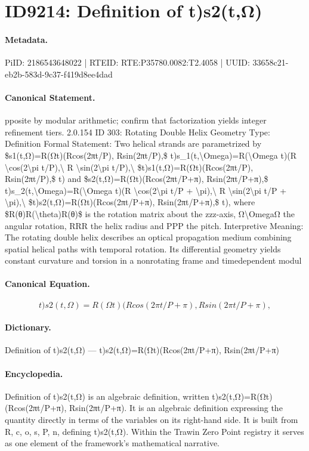 \section*{ID9214: Definition of t)s2(t,Ω)}
\paragraph{Metadata.}
PiID: 2186543648022 | RTEID: RTE:P35780.0082:T2.4058 | UUID: 33658c21-eb2b-583d-9c37-f419d8ee4dad

\paragraph{Canonical Statement.}
pposite by modular arithmetic; confirm that factorization yields integer refinement tiers. 2.0.154 ID 303: Rotating Double Helix Geometry Type: Definition Formal Statement: Two helical strands are parametrized by \$s1(t,Ω)=R(Ωt)(Rcos(2πt/P), Rsin(2πt/P),\$ t)s\_1(t,\textbackslash{}Omega)=R(\textbackslash{}Omega t)(R \textbackslash{}cos(2\textbackslash{}pi t/P),\textbackslash{} R \textbackslash{}sin(2\textbackslash{}pi t/P),\textbackslash{} \$t)s1(t,Ω)=R(Ωt)(Rcos(2πt/P), Rsin(2πt/P),\$ t) and \$s2(t,Ω)=R(Ωt)(Rcos(2πt/P+π), Rsin(2πt/P+π),\$ t)s\_2(t,\textbackslash{}Omega)=R(\textbackslash{}Omega t)(R \textbackslash{}cos(2\textbackslash{}pi t/P + \textbackslash{}pi),\textbackslash{} R \textbackslash{}sin(2\textbackslash{}pi t/P + \textbackslash{}pi),\textbackslash{} \$t)s2(t,Ω)=R(Ωt)(Rcos(2πt/P+π), Rsin(2πt/P+π),\$ t), where \$R(θ)R(\textbackslash{}theta)R(θ)\$ is the rotation matrix about the zzz-axis, Ω\textbackslash{}OmegaΩ the angular rotation, RRR the helix radius and PPP the pitch. Interpretive Meaning: The rotating double helix describes an optical propagation medium combining spatial helical paths with temporal rotation. Its differential geometry yields constant curvature and torsion in a nonrotating frame and timedependent modul

\paragraph{Canonical Equation.}
\[
t)s2(t,Ω)=R(Ωt)(Rcos(2πt/P+π), Rsin(2πt/P+π),
\]

\paragraph{Dictionary.}
Definition of t)s2(t,Ω) — t)s2(t,Ω)=R(Ωt)(Rcos(2πt/P+π), Rsin(2πt/P+π)

\paragraph{Encyclopedia.}
Definition of t)s2(t,Ω) is an algebraic definition, written t)s2(t,Ω)=R(Ωt)(Rcos(2πt/P+π), Rsin(2πt/P+π). It is an algebraic definition expressing the quantity directly in terms of the variables on its right-hand side. It is built from R, c, o, s, P, n, defining t)s2(t,Ω). Within the Trawin Zero Point registry it serves as one element of the framework's mathematical narrative.
